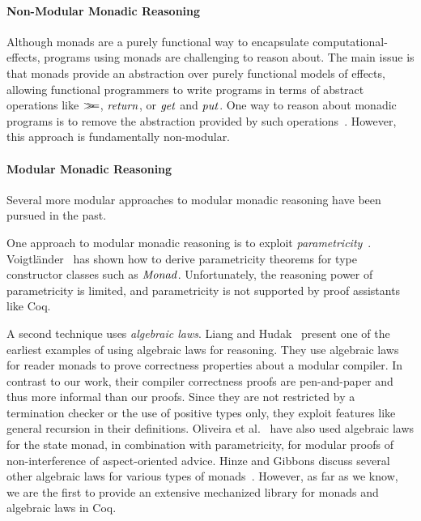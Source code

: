 \paragraph{Non-Modular Monadic Reasoning}
Although monads are a purely functional way to encapsulate
computational-effects, programs using monads are challenging to reason about.
The main issue is that monads provide an abstraction over purely functional
models of effects, allowing functional programmers to write programs in terms
of abstract operations like \ensuremath{\bind }, \ensuremath{\Varid{return}}, or \ensuremath{\Varid{get}} and \ensuremath{\Varid{put}}. One way to
reason about monadic programs is to remove the abstraction provided by such
operations~\citep{hutton08reasoning}. However, this approach is fundamentally
non-modular.   

\paragraph{Modular Monadic Reasoning}
Several more modular approaches to modular monadic reasoning have been pursued
in the past. 

One approach to modular monadic reasoning is to exploit
\emph{parametricity}~\citep{reynolds83types,wadler89theorems}.
Voigtl\"ander~\cite{voigt09free} has shown how to derive parametricity
theorems for type constructor classes such as \ensuremath{\Conid{Monad}}. Unfortunately,
the reasoning power of parametricity is limited, and parametricity is
not supported by proof assistants like Coq.

A second technique uses \emph{algebraic laws}. Liang and
Hudak~\cite{liang96modular} present one of the earliest examples of
using algebraic laws for reasoning. They use algebraic laws for
reader monads to prove correctness properties about a modular
compiler.  In contrast to our work, their compiler correctness proofs
are pen-and-paper and thus more informal than our proofs. Since they are
not restricted by a termination checker or the use of positive types
only, they exploit features like general recursion in their
definitions.  Oliveira et al.~\cite{effectiveadvice} have also used
algebraic laws for the state monad, in combination with parametricity,
for modular proofs of non-interference of aspect-oriented
advice. Hinze and Gibbons discuss several other algebraic laws for
various types of monads~\cite{gibbons11just}.  However, as far as we
know, we are the first to provide an extensive mechanized library for
monads and algebraic laws in Coq.  

